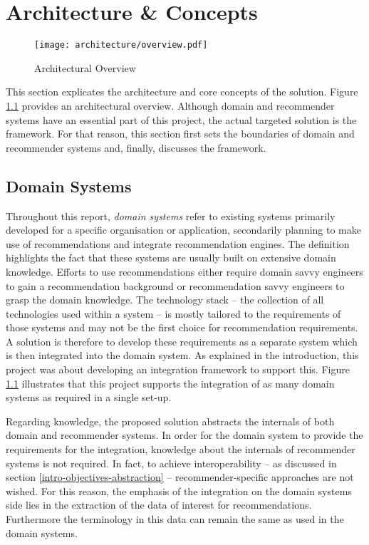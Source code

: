 \chapter{Architecture \& Concepts}

\begin{figure}[ht]
    \texttt{[image: architecture/overview.pdf]}
    \caption{Architectural Overview}
    \label{fig:architecture}
\end{figure}

This section explicates the architecture and core concepts of the solution. Figure \ref{fig:architecture} provides an architectural overview. Although domain and recommender systems have an essential part of this project, the actual targeted solution is the framework. For that reason, this section first sets the boundaries of domain and recommender systems and, finally, discusses the framework.

\section{Domain Systems}
\label{architecture-domain-systems}

Throughout this report, \emph{domain systems} refer to existing systems primarily developed for a specific organisation or application, secondarily planning to make use of recommendations and integrate recommendation engines. The definition highlights the fact that these systems are usually built on extensive domain knowledge. Efforts to use recommendations either require domain savvy engineers to gain a recommendation background or recommendation savvy engineers to grasp the domain knowledge. The technology stack -- the collection of all technologies used within a system -- is mostly tailored to the requirements of those systems and may not be the first choice for recommendation requirements. A solution is therefore to develop these requirements as a separate system which is then integrated into the domain system. As explained in the introduction, this project was about developing an integration framework to support this. Figure \ref{fig:architecture} illustrates that this project supports the integration of as many domain systems as required in a single set-up.

Regarding knowledge, the proposed solution abstracts the internals of both domain and recommender systems. In order for the domain system to provide the requirements for the integration, knowledge about the internals of recommender systems is not required. In fact, to achieve interoperability -- as discussed in section \ref{intro-objectives-abstraction} -- recommender-specific approaches are not wished. For this reason, the emphasis of the integration on the domain systems side lies in the extraction of the data of interest for recommendations. Furthermore the terminology in this data can remain the same as used in the domain systems.

